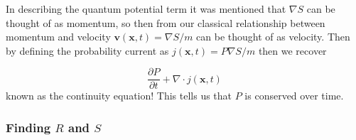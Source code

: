 In describing the quantum potential term it was mentioned that $\nabla S$ can be thought of as momentum, so then from our classical relationship between momentum and velocity  $\textbf{v}(\textbf{x},t)=\nabla S/m$ can be thought of as velocity. Then by defining the probability current as $j(\mathbf{x},t) = P\nabla S/m$ then we recover

\begin{equation}
\label{ProbCurrent}
\frac{\partial P}{\partial t} + \nabla \cdot j(\mathbf{x},t)
\end{equation}
known as the continuity equation! This tells us that $P$ is conserved over time.

\subsubsection{Finding $R$ and $S$}

